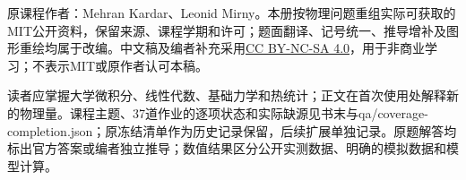 原课程作者：Mehran Kardar、Leonid Mirny。本册按物理问题重组实际可获取的MIT公开资料，保留来源、课程学期和许可；题面翻译、记号统一、推导增补及图形重绘均属于改编。中文稿及编者补充采用\href{https://creativecommons.org/licenses/by-nc-sa/4.0/}{CC BY-NC-SA 4.0}，用于非商业学习；不表示MIT或原作者认可本稿。

读者应掌握大学微积分、线性代数、基础力学和热统计；正文在首次使用处解释新的物理量。课程主题、37道作业的逐项状态和实际缺源见书末与qa/coverage-completion.json；原冻结清单作为历史记录保留，后续扩展单独记录。原题解答均标出官方答案或编者独立推导；数值结果区分公开实测数据、明确的模拟数据和模型计算。
